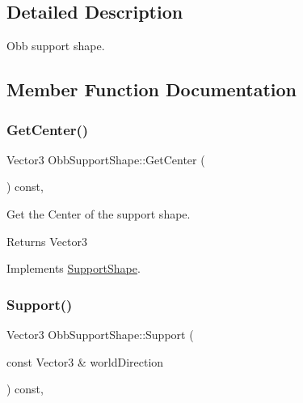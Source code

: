 \subsection{Detailed Description}
Obb support shape. 

\subsection{Member Function Documentation}
\mbox{\label{classObbSupportShape_a0e18c90f510e3829d73e8b4478e68a81}} 
\subsubsection{\texorpdfstring{Get\+Center()}{GetCenter()}}
{\footnotesize\ttfamily Vector3 Obb\+Support\+Shape\+::\+Get\+Center (\begin{DoxyParamCaption}{ }\end{DoxyParamCaption}) const\hspace{0.3cm}{\ttfamily [override]}, {\ttfamily [virtual]}}



Get the Center of the support shape. 

\begin{DoxyReturn}{Returns}
Vector3 
\end{DoxyReturn}


Implements \hyperlink{classSupportShape_ac81f62a38aeadbf03d637e5134479467}{Support\+Shape}.

\mbox{\label{classObbSupportShape_ae47da1aea42eedb3327bc71aa08a0d65}} 
\subsubsection{\texorpdfstring{Support()}{Support()}}
{\footnotesize\ttfamily Vector3 Obb\+Support\+Shape\+::\+Support (\begin{DoxyParamCaption}\item[{const Vector3 \&}]{world\+Direction }\end{DoxyParamCaption}) const\hspace{0.3cm}{\ttfamily [override]}, {\ttfamily [virtual]}}



